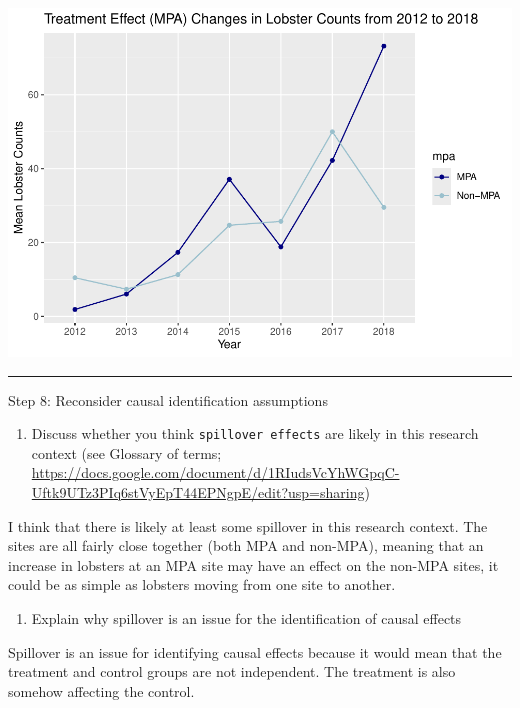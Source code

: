 \documentclass[
]{article}
\providecommand{\tightlist}{%
  \setlength{\itemsep}{0pt}\setlength{\parskip}{0pt}}
\begin{document}
\includegraphics{hw1-lobstrs-eds241_files/figure-latex/unnamed-chunk-24-1.pdf}

\begin{center}\rule{0.5\linewidth}{0.5pt}\end{center}

Step 8: Reconsider causal identification assumptions

\begin{enumerate}
\def\labelenumi{\alph{enumi}.}
\tightlist
\item
  Discuss whether you think \texttt{spillover\ effects} are likely in
  this research context (see Glossary of terms;
  \url{https://docs.google.com/document/d/1RIudsVcYhWGpqC-Uftk9UTz3PIq6stVyEpT44EPNgpE/edit?usp=sharing})
\end{enumerate}

I think that there is likely at least some spillover in this research
context. The sites are all fairly close together (both MPA and non-MPA),
meaning that an increase in lobsters at an MPA site may have an effect
on the non-MPA sites, it could be as simple as lobsters moving from one
site to another.

\begin{enumerate}
\def\labelenumi{\alph{enumi}.}
\setcounter{enumi}{1}
\tightlist
\item
  Explain why spillover is an issue for the identification of causal
  effects
\end{enumerate}

Spillover is an issue for identifying causal effects because it would
mean that the treatment and control groups are not independent. The
treatment is also somehow affecting the control.
\end{document}
